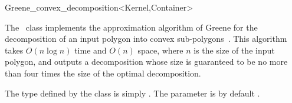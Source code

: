 
\ccRefPageBegin

\begin{ccRefClass}{Greene_convex_decomposition<Kernel,Container>}
\label{mink_ref:Greene_decomp}


\ccDefinition

The \ccRefName\ class implements the approximation algorithm of
Greene for the decomposition of an input polygon into convex
sub-polygons~\cite{g-dpcp-83}. This algorithm takes $O(n \log n)$
time and $O(n)$ space, where $n$ is the size of the input polygon,
and outputs a decomposition whose size is guaranteed to be no more
than four times the size of the optimal decomposition.

The  type defined by the class is simply
. The  parameter
is by default .


\ccIsModel

\end{ccRefClass}

\ccRefPageEnd
